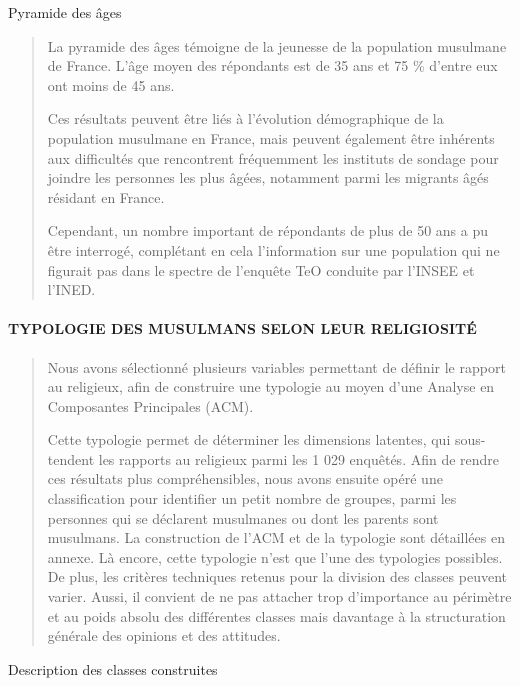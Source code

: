 Pyramide des âges

\begin{quote}
La pyramide des âges témoigne de la jeunesse de la population musulmane
de France. L'âge moyen des répondants est de 35 ans et 75 \% d'entre eux
ont moins de 45 ans.

Ces résultats peuvent être liés à l'évolution démographique de la
population musulmane en France, mais peuvent également être inhérents
aux difficultés que rencontrent fréquemment les instituts de sondage
pour joindre les personnes les plus âgées, notamment parmi les migrants
âgés résidant en France.

Cependant, un nombre important de répondants de plus de 50 ans a pu être
interrogé, complétant en cela l'information sur une population qui ne
figurait pas dans le spectre de l'enquête TeO conduite par l'INSEE et
l'INED.


\end{quote}

\hypertarget{typologie-des-musulmans-selon-leur-religiosituxe9}{%
\paragraph{TYPOLOGIE DES MUSULMANS SELON LEUR
RELIGIOSITÉ}\label{typologie-des-musulmans-selon-leur-religiosituxe9}}

\begin{quote}
Nous avons sélectionné plusieurs variables permettant de définir le
rapport au religieux, afin de construire une typologie au moyen d'une
Analyse en Composantes Principales (ACM).

Cette typologie permet de déterminer les dimensions latentes, qui
sous-tendent les rapports au religieux parmi les 1 029 enquêtés. Afin de
rendre ces résultats plus compréhensibles, nous avons ensuite opéré une
classification pour identifier un petit nombre de groupes, parmi les
personnes qui se déclarent musulmanes ou dont les parents sont
musulmans. La construction de l'ACM et de la typologie sont détaillées
en annexe. Là encore, cette typologie n'est que l'une des typologies
possibles. De plus, les critères techniques retenus pour la division des
classes peuvent varier. Aussi, il convient de ne pas attacher trop
d'importance au périmètre et au poids absolu des différentes classes
mais davantage à la structuration générale des opinions et des
attitudes.
\end{quote}

Description des classes construites

